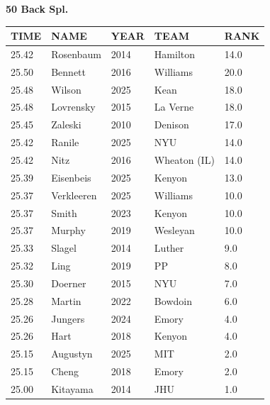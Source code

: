 \begin{table}[H]
\centering
\begin{minipage}[t]{0.6\textwidth}
\centering
\textbf{50 Back Spl.}\\[0.1cm]
\begin{tabular}{@{}p{1.8cm}p{2.8cm}p{1.2cm}p{1.4cm}p{0.8cm}@{}}
\hline
    \textbf{TIME} & \textbf{NAME} & \textbf{YEAR} & \textbf{TEAM} & \textbf{RANK} \\
\hline
    25.42 & Rosenbaum & 2014 & Hamilton & 14.0 \\
    25.50 & Bennett & 2016 & Williams & 20.0 \\
    25.48 & Wilson & 2025 & Kean & 18.0 \\
    25.48 & Lovrensky & 2015 & La Verne & 18.0 \\
    25.45 & Zaleski & 2010 & Denison & 17.0 \\
    25.42 & Ranile & 2025 & NYU & 14.0 \\
    25.42 & Nitz & 2016 & Wheaton (IL) & 14.0 \\
    25.39 & Eisenbeis & 2025 & Kenyon & 13.0 \\
    25.37 & Verkleeren & 2025 & Williams & 10.0 \\
    25.37 & Smith & 2023 & Kenyon & 10.0 \\
    25.37 & Murphy & 2019 & Wesleyan & 10.0 \\
    25.33 & Slagel & 2014 & Luther & 9.0 \\
    25.32 & Ling & 2019 & PP & 8.0 \\
    25.30 & Doerner & 2015 & NYU & 7.0 \\
    25.28 & Martin & 2022 & Bowdoin & 6.0 \\
    25.26 & Jungers & 2024 & Emory & 4.0 \\
    25.26 & Hart & 2018 & Kenyon & 4.0 \\
    25.15 & Augustyn & 2025 & MIT & 2.0 \\
    25.15 & Cheng & 2018 & Emory & 2.0 \\
    25.00 & Kitayama & 2014 & JHU & 1.0 \\
\hline
\end{tabular}
\end{minipage}
\end{table}

